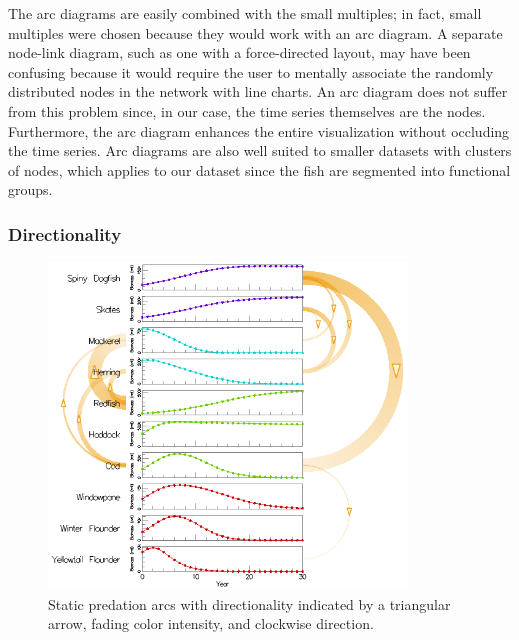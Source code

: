 The arc diagrams are easily combined with the small multiples; in fact, small multiples were chosen because they would work with an arc diagram.  A separate node-link diagram, such as one with a force-directed layout, may have been confusing because it would require the user to mentally associate the randomly distributed nodes in the network with line charts.  An arc diagram does not suffer from this problem since, in our case, the time series themselves are the nodes.  Furthermore, the arc diagram enhances the entire visualization without occluding the time series.  Arc diagrams are also well suited to smaller datasets with clusters of nodes, which applies to our dataset since the fish are segmented into functional groups.

\subsubsection{Directionality}

\begin{figure}[h]
	\centering
	\includegraphics[width=0.85\textwidth]{figures/png/arcs_directionality.png}
	\caption{Static predation arcs with directionality indicated by a triangular arrow, fading color intensity, and clockwise direction.}
	\label{fig:arcs_directionality}
\end{figure}

